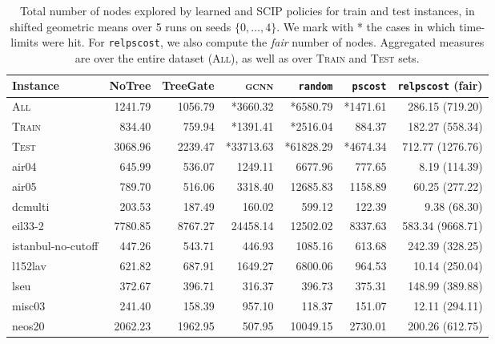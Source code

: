 \documentclass[letterpaper]{article} %
\begin{document}
\begin{table*}[!t]
    \caption{Total number of nodes explored by learned and SCIP policies for train and test instances, in shifted geometric means over 5 runs on seeds $\{0, \dots, 4\}$. We mark with * the cases in which time-limits were hit. For \texttt{relpscost}, we also compute the \emph{fair} number of nodes. Aggregated measures are over the entire dataset (\textsc{All}), as well as over \textsc{Train} and \textsc{Test} sets.}
    \label{tab:nnodes_eval}
    \centering
    \begin{footnotesize}
\begin{tabular}{lrrrrrr}
\toprule
           Instance &    NoTree &  TreeGate &  \textsc{gcnn} &     \texttt{random} &     \texttt{pscost} &  \texttt{relpscost} (fair) \\
\midrule
       \textsc{All} &    1241.79 &   1056.79 &  *3660.32 &    *6580.79 &    *1471.61 &     286.15 (719.20) \\
     \textsc{Train} &     834.40 &    759.94 &   *1391.41 &    *2516.04 &     884.37 &     182.27 (558.34) \\
      \textsc{Test} &    3068.96 &   2239.47 &  *33713.63 &   *61828.29 &    *4674.34 &     712.77 (1276.76) \\
\midrule
              air04 &      645.99 &    536.07 & 1249.11  &    6677.96 &     777.65 &       8.19 (114.39) \\
              air05 &      789.70 &    516.06 &  3318.40 &   12685.83 &    1158.89 &      60.25 (277.22) \\
            dcmulti &      203.53 &    187.49 &  160.02 &     599.12 &     122.39 &       9.38 (68.30) \\
            eil33-2 &     7780.85 &   8767.27 &  24458.14 &   12502.02 &    8337.63 &     583.34 (9668.71) \\
 istanbul-no-cutoff &      447.26 &    543.71 &  446.93 &    1085.16 &     613.68 &     242.39 (328.25) \\
            l152lav &      621.82 &    687.91 &  1649.27 &    6800.06 &     964.53 &      10.14 (250.04) \\
              lseu &      372.67 &    396.71 &  316.37 &     396.73 &     375.31 &     148.99 (389.88) \\
             misc03 &      241.40 &    158.39 &  957.10 &     118.37 &     151.07 &      12.11 (294.11) \\
             neos20 &     2062.23 &   1962.95 &  507.95 &   10049.15 &    2730.01 &     200.26 (612.75) \\

\end{tabular}
\end{footnotesize}
\end{table*}
\end{document}
